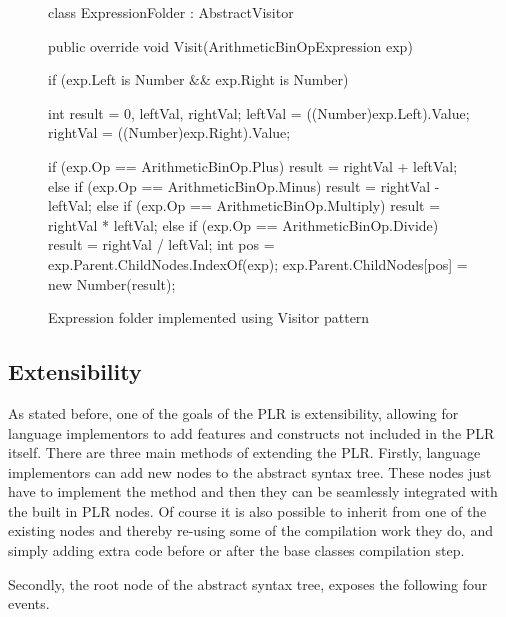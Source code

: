 	\begin{figure}[h!]
	\begin{csharp}
class ExpressionFolder : AbstractVisitor{

  public override void Visit(ArithmeticBinOpExpression exp) {
    if (exp.Left is Number && exp.Right is Number) {
      int result = 0, leftVal, rightVal;
      leftVal = ((Number)exp.Left).Value;
      rightVal = ((Number)exp.Right).Value;
		
      if (exp.Op == ArithmeticBinOp.Plus) {
        result = rightVal + leftVal;
      } else if (exp.Op == ArithmeticBinOp.Minus) {
        result = rightVal - leftVal;
      } else if (exp.Op == ArithmeticBinOp.Multiply) {
        result = rightVal * leftVal;
      } else if (exp.Op == ArithmeticBinOp.Divide) {
        result = rightVal / leftVal;
      }
      int pos = exp.Parent.ChildNodes.IndexOf(exp);
      exp.Parent.ChildNodes[pos] = new Number(result);
    }
  }
}
\end{csharp}
\caption{Expression folder implemented using Visitor pattern} \label{fig:expression_folder}
\end{figure}

\subsection{Extensibility}
	
	As stated before, one of the goals of the PLR is extensibility, allowing
	for language implementors to add features and constructs not included in
	the PLR itself. There are three main methods of extending the PLR. Firstly,
	language implementors can add new nodes to the abstract syntax tree. These
	nodes just have to implement the  method and then they can
	be seamlessly integrated with the built in PLR nodes. Of course it is also
	possible to inherit from one of the existing nodes and thereby re-using some
	of the compilation work they do, and simply adding extra code before or after
	the base classes compilation step. 
	
	Secondly, the root node of the abstract	syntax tree,  
	exposes the following four events. 
	
